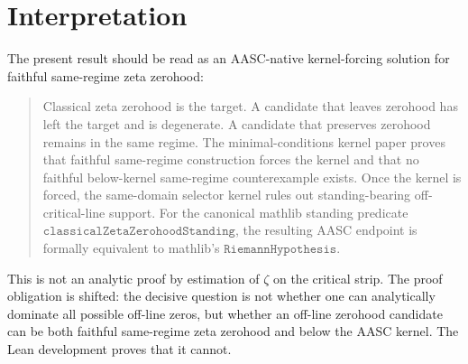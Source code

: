 \documentclass[11pt]{article}
\begin{document}
\section{Interpretation}

The present result should be read as an AASC-native kernel-forcing solution for
faithful same-regime zeta zerohood:
\begin{quote}
Classical zeta zerohood is the target.  A candidate that leaves zerohood has
left the target and is degenerate.  A candidate that preserves zerohood remains
in the same regime.  The minimal-conditions kernel paper proves that faithful
same-regime construction forces the kernel and that no faithful below-kernel
same-regime counterexample exists.  Once the kernel is forced, the same-domain
selector kernel rules out standing-bearing off-critical-line support.  For the
canonical mathlib standing predicate
\(\texttt{classicalZetaZerohoodStanding}\), the resulting AASC endpoint is
formally equivalent to mathlib's \(\texttt{RiemannHypothesis}\).
\end{quote}

This is not an analytic proof by estimation of \(\zeta\) on the critical
strip.  The proof obligation is shifted: the decisive question is not whether
one can analytically dominate all possible off-line zeros, but whether an
off-line zerohood candidate can be both faithful same-regime zeta zerohood and
below the AASC kernel.  The Lean development proves that it cannot.
\end{document}
